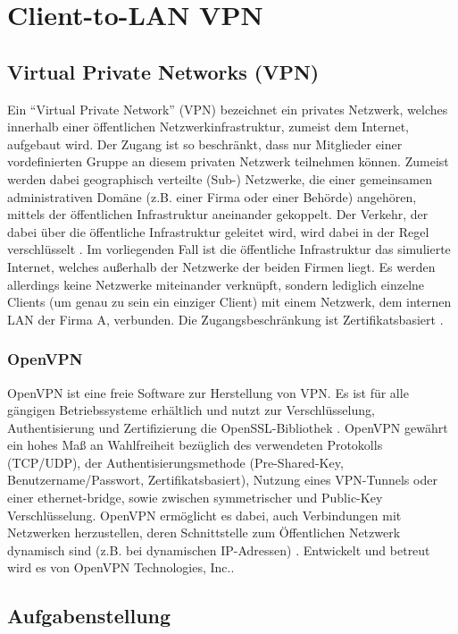 \chapter{Client-to-LAN VPN}

\section{Virtual Private Networks (VPN)}
Ein "`Virtual Private Network"' (VPN) bezeichnet ein privates Netzwerk, welches innerhalb einer öffentlichen Netzwerkinfrastruktur, zumeist dem Internet, aufgebaut wird. Der Zugang ist so beschränkt, dass nur Mitglieder einer vordefinierten Gruppe an diesem privaten Netzwerk teilnehmen können. Zumeist werden dabei geographisch verteilte (Sub-) Netzwerke, die einer gemeinsamen administrativen Domäne (z.B. einer Firma oder einer Behörde) angehören, mittels der öffentlichen Infrastruktur aneinander gekoppelt. Der Verkehr, der dabei über die öffentliche Infrastruktur geleitet wird, wird dabei in der Regel verschlüsselt \cite{Ferguson1998}. Im vorliegenden Fall ist die öffentliche Infrastruktur das simulierte Internet, welches außerhalb der Netzwerke der beiden Firmen liegt. Es werden allerdings keine Netzwerke miteinander verknüpft, sondern lediglich einzelne Clients (um genau zu sein ein einziger Client) mit einem Netzwerk, dem internen LAN der Firma A, verbunden. Die Zugangsbeschränkung ist Zertifikatsbasiert \cite{Neuschwander2014}.

\subsection{OpenVPN}
OpenVPN ist eine freie Software zur Herstellung von VPN. Es ist für alle gängigen Betriebssysteme erhältlich und nutzt zur Verschlüsselung, Authentisierung und Zertifizierung die OpenSSL-Bibliothek \cite{OpenVPNeu}. OpenVPN gewährt ein hohes Maß an Wahlfreiheit bezüglich des verwendeten Protokolls (TCP/UDP), der Authentisierungsmethode (Pre-Shared-Key, Benutzername/Passwort, Zertifikatsbasiert), Nutzung eines VPN-Tunnels oder einer ethernet-bridge, sowie zwischen symmetrischer und Public-Key Verschlüsselung. OpenVPN ermöglicht es dabei, auch Verbindungen mit Netzwerken herzustellen, deren Schnittstelle zum Öffentlichen Netzwerk dynamisch sind (z.B. bei dynamischen IP-Adressen) \cite{wiOpenVPN}. Entwickelt und betreut wird es von OpenVPN Technologies, Inc..

\section{Aufgabenstellung}

